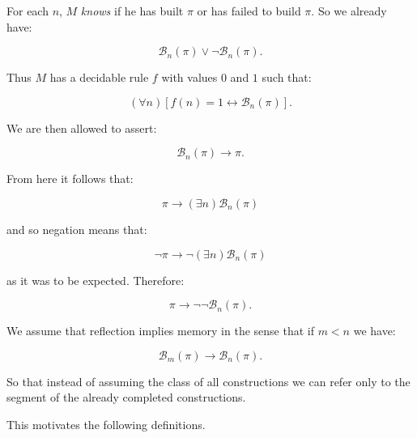\documentclass[12pt]{article}
\begin{document}
For each $n$, $M$ \emph{knows} if he has built $\pi$ or has failed to build $\pi$. So we already have:

$$\mathcal{B}_n (\pi) \vee \neg \mathcal{B}_n (\pi).$$

Thus $M$ has a decidable rule $f$ with values $0$ and $1$ such that:

$$(\forall n) [ f (n) = 1 \leftrightarrow  \mathcal{B}_n (\pi)].$$

We are then allowed to assert:

$$\mathcal{B}_n (\pi) \rightarrow \pi.$$

From here it follows that:

$$\pi \rightarrow (\exists n) \mathcal{B}_n (\pi)$$

and so negation means that: 
                                 
$$\neg \pi \rightarrow \neg (\exists n) \mathcal{B}_n (\pi)$$

as it was to be expected. Therefore:

$$\pi \rightarrow \neg \neg \mathcal{B}_n (\pi).$$
                                     
We assume that reflection implies memory in the sense that if $m < n$ we have:
 
$$\mathcal{B}_m (\pi) \rightarrow \mathcal{B}_n (\pi).$$

So that instead of assuming the class of all constructions we can refer only to the segment of the already completed constructions.

This motivates the following definitions.
\end{document}
